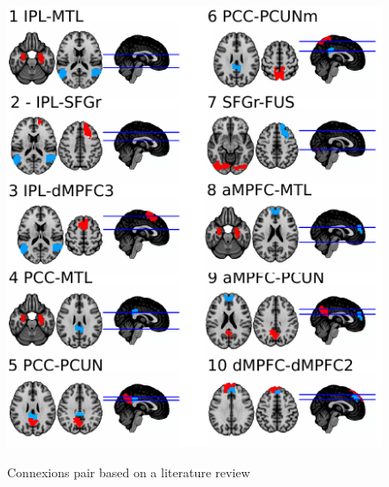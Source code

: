 \documentclass[authoryear]{elsarticle}
\begin{document}
\begin{figure}[H!]
\begin{center}
\includegraphics[width=0.5\linewidth]{../figures/p2p_seeds.pdf}
\end{center}
\tiny{Connexions pair based on a literature review}
\label{fig_p2p}
\end{figure}
\end{document}
